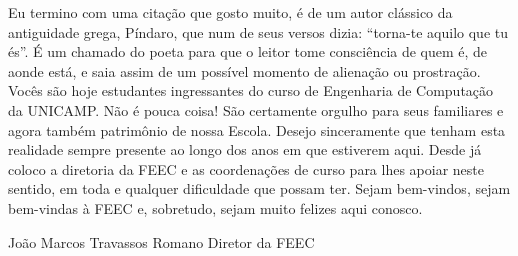  Eu termino com uma citação que gosto muito, é de um autor clássico da
 antiguidade grega, Píndaro, que num de seus versos dizia: “torna-te aquilo que
 tu és”. É um chamado do poeta para que o leitor tome consciência de quem é, de
 aonde está, e saia assim de um possível momento de alienação ou prostração.
 Vocês são hoje estudantes ingressantes do curso de Engenharia de Computação da
 UNICAMP. Não é pouca coisa! São certamente orgulho para seus familiares e agora
 também patrimônio de nossa Escola. Desejo sinceramente que tenham esta
 realidade sempre presente ao longo dos anos em que estiverem aqui. Desde já
 coloco a diretoria da FEEC e as coordenações de curso para lhes apoiar neste
 sentido, em toda e qualquer dificuldade que possam ter. Sejam bem-vindos, sejam
 bem-vindas à FEEC e, sobretudo, sejam muito felizes aqui conosco.

 João Marcos Travassos Romano
 Diretor da FEEC

